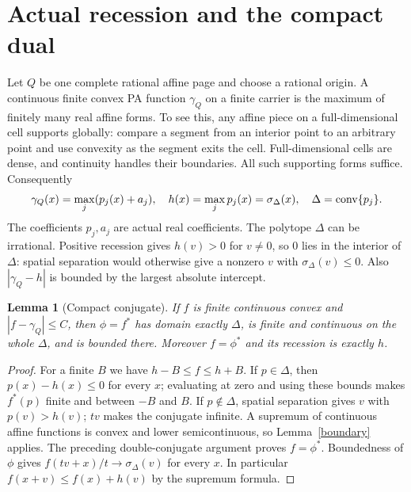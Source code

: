 \documentclass[11pt]{article}
\newtheorem{lemma}[theorem]{Lemma}
\theoremstyle{definition}\newtheorem{definition}[theorem]{Definition}
\theoremstyle{remark}\newtheorem{remark}[theorem]{Remark}
\begin{document}
\section{Actual recession and the compact dual}
Let $Q$ be one complete rational affine page and choose a rational origin. A continuous finite convex PA function $\gamma_Q$ on a finite carrier is the maximum of finitely many real affine forms. To see this, any affine piece on a full-dimensional cell supports globally: compare a segment from an interior point to an arbitrary point and use convexity as the segment exits the cell. Full-dimensional cells are dense, and continuity handles their boundaries. All such supporting forms suffice. Consequently
\begin{equation}\label{actualdual}
\gamma_Q(x)=\max_j(p_j(x)+a_j),\quad h(x)=\max_jp_j(x)=\sigma_\Delta(x),\quad
\Delta=\operatorname{conv}\{p_j\}.
\end{equation}
The coefficients $p_j,a_j$ are actual real coefficients. The polytope $\Delta$ can be irrational. Positive recession gives $h(v)>0$ for $v\ne0$, so $0$ lies in the interior of $\Delta$: spatial separation would otherwise give a nonzero $v$ with $\sigma_\Delta(v)\leq0$. Also $|\gamma_Q-h|$ is bounded by the largest absolute intercept.

\begin{lemma}[Compact conjugate]\label{dual}
If $f$ is finite continuous convex and $|f-\gamma_Q|\leq C$, then $\phi=f^*$ has domain exactly $\Delta$, is finite and continuous on the whole $\Delta$, and is bounded there. Moreover $f=\phi^*$ and its recession is exactly $h$.
\end{lemma}
\begin{proof}
For a finite $B$ we have $h-B\leq f\leq h+B$. If $p\in\Delta$, then $p(x)-h(x)\leq0$ for every $x$; evaluating at zero and using these bounds makes $f^*(p)$ finite and between $-B$ and $B$. If $p\notin\Delta$, spatial separation gives $v$ with $p(v)>h(v)$; $tv$ makes the conjugate infinite. A supremum of continuous affine functions is convex and lower semicontinuous, so Lemma~\ref{boundary} applies. The preceding double-conjugate argument proves $f=\phi^*$. Boundedness of $\phi$ gives $f(tv+x)/t\to\sigma_\Delta(v)$ for every $x$. In particular $f(x+v)\leq f(x)+h(v)$ by the supremum formula.
\end{proof}
\end{document}
